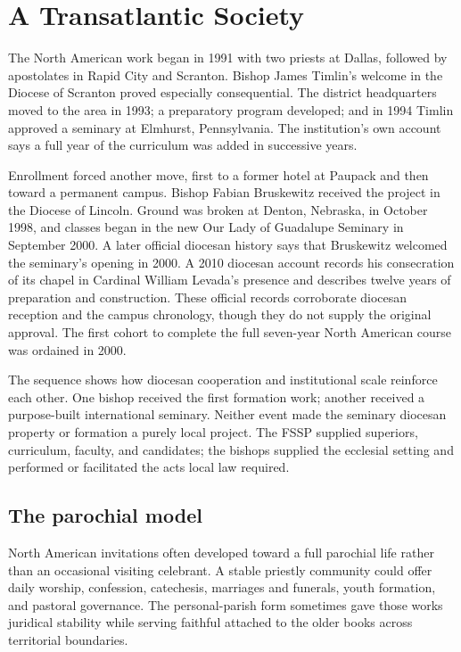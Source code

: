 \section{A Transatlantic Society}

The North American work began in 1991 with two priests at Dallas, followed by apostolates in Rapid City and Scranton. Bishop James Timlin's welcome in the Diocese of Scranton proved especially consequential. The district headquarters moved to the area in 1993; a preparatory program developed; and in 1994 Timlin approved a seminary at Elmhurst, Pennsylvania. The institution's own account says a full year of the curriculum was added in successive years.

Enrollment forced another move, first to a former hotel at Paupack and then toward a permanent campus. Bishop Fabian Bruskewitz received the project in the Diocese of Lincoln. Ground was broken at Denton, Nebraska, in October 1998, and classes began in the new Our Lady of Guadalupe Seminary in September 2000. A later official diocesan history says that Bruskewitz welcomed the seminary's opening in 2000. A 2010 diocesan account records his consecration of its chapel in Cardinal William Levada's presence and describes twelve years of preparation and construction. These official records corroborate diocesan reception and the campus chronology, though they do not supply the original approval. The first cohort to complete the full seven-year North American course was ordained in 2000.

The sequence shows how diocesan cooperation and institutional scale reinforce each other. One bishop received the first formation work; another received a purpose-built international seminary. Neither event made the seminary diocesan property or formation a purely local project. The FSSP supplied superiors, curriculum, faculty, and candidates; the bishops supplied the ecclesial setting and performed or facilitated the acts local law required.

\subsection{The parochial model}

North American invitations often developed toward a full parochial life rather than an occasional visiting celebrant. A stable priestly community could offer daily worship, confession, catechesis, marriages and funerals, youth formation, and pastoral governance. The personal-parish form sometimes gave those works juridical stability while serving faithful attached to the older books across territorial boundaries.

